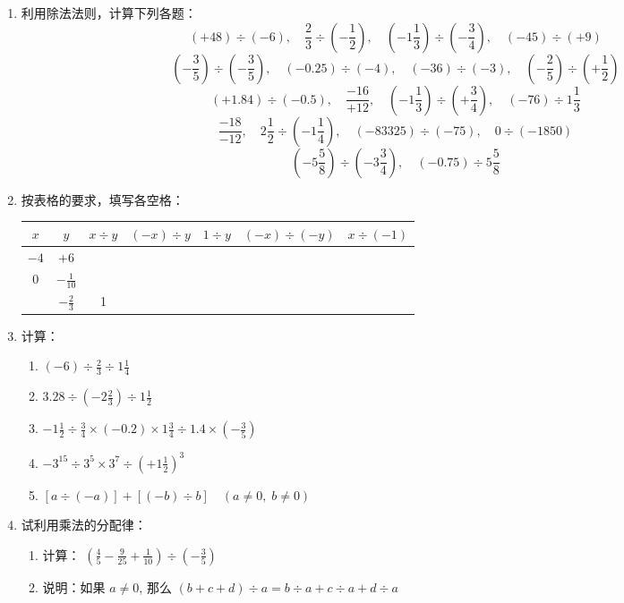 \begin{enumerate}
	\item 利用除法法则，计算下列各题：
	\[(+48)\div (-6),\quad \frac{2}{3}\div \left(-\frac{1}{2}\right),\quad \left(-1 \frac{1}{3}\right)\div\left(-\frac{3}{4}\right), \quad (-45)\div (+9)\]
	\[\left(-\frac{3}{5}\right) \div\left(-\frac{3}{5}\right), \quad (-0.25) \div(-4), \quad 
	(-36) \div(-3), \quad\left(-\frac{2}{5}\right) \div\left(+\frac{1}{2}\right)\]
	\[(+1.84) \div(-0.5), \quad \frac{-16}{+12},\quad 
	\left(-1 \frac{1}{3}\right)\div\left(+\frac{3}{4}\right), \quad(-76) \div 1 \frac{1}{3}\]
	\[\frac{-18}{-12}, \quad 2 \frac{1}{2}\div \left(-1\frac{1}{4}\right),\quad (-83325) \div(-75), \quad 0 \div(-1850)\]
	\[\left(-5 \frac{5}{8}\right)\div \left(-3 \frac{3}{4}\right), \quad(-0.75) \div 5 \frac{5}{8}\]
	
	\item 按表格的要求，填写各空格：
	\begin{center}
		\begin{tabular}{c|c|c|c|c|c|c}
			\hline
			$x$  &  $y$  &  $x\div y$  &  $(-x)\div y$  &     $1\div y$  &  $(-x)\div(-y)$ &$x\div(-1)$\\
			\hline
			$-4$ & $+6$  &&&&&\\
			$0$ & $-\frac{1}{10}$  &&&&&\\
			& $-\frac{2}{3}$  &1&&&&\\
			\hline
		\end{tabular}    
	\end{center}
	
	\item 计算：
	\begin{enumerate}
		\item $(-6) \div \frac{2}{3} \div 1 \frac{1}{4}$
		\item $3.28 \div\left(-2 \frac{2}{3}\right) \div 1 \frac{1}{2}$
		\item $-1 \frac{1}{2} \div \frac{3}{4} \times(-0.2) \times 1 \frac{3}{4} \div 1.4 \times\left(-\frac{3}{5}\right)$
		\item $-3^{15}\div 3^{5} \times 3^{7} \div\left(+1 \frac{1}{2}\right)^{3}$
		\item $[a\div (-a)]+[(-b)\div b] \quad (a \neq 0,\; b \neq 0)$
	\end{enumerate}
	\item 试利用乘法的分配律：
	\begin{enumerate}
		\item 计算： $\left(\frac{4}{5}-\frac{9}{25}+\frac{1}{10}\right) \div\left(-\frac{3}{5}\right)$
		\item 说明：如果 $a \neq 0$, 那么 $(b+c+d)\div a=b \div a+c\div a+d\div a$
	\end{enumerate}
	

\end{enumerate}
